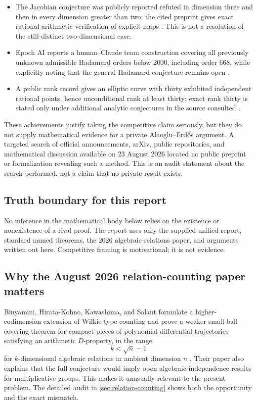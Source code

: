 \documentclass[10pt,oneside]{article}
\theoremstyle{definition}
\theoremstyle{remark}
\begin{document}
\begin{itemize}
\item The Jacobian conjecture was publicly reported refuted in dimension three and then in every dimension greater than two; the cited preprint gives exact rational-arithmetic verification of explicit maps \cite{Gao2026}.  This is not a resolution of the still-distinct two-dimensional case.
\item Epoch AI reports a human--Claude team construction covering all previously unknown admissible Hadamard orders below 2000, including order 668, while explicitly noting that the general Hadamard conjecture remains open \cite{EpochHadamard2026}.
\item A public rank record gives an elliptic curve with thirty exhibited independent rational points, hence unconditional rank at least thirty; exact rank thirty is stated only under additional analytic conjectures in the source consulted \cite{MathWorldRank2026}.
\end{itemize}

These achievements justify taking the competitive claim seriously, but they do not supply mathematical evidence for a private Alaoglu--Erd\H{o}s argument.  A targeted search of official announcements, arXiv, public repositories, and mathematical discussion available on 23 August 2026 located no public preprint or formalization revealing such a method.  This is an audit statement about the search performed, not a claim that no private result exists.

\subsection{Truth boundary for this report}
\begin{cautionbox}
No inference in the mathematical body below relies on the existence or nonexistence of a rival proof.  The report uses only the supplied unified report, standard named theorems, the 2026 algebraic-relations paper, and arguments written out here.  Competitive framing is motivational; it is not evidence.
\end{cautionbox}

\subsection{Why the August 2026 relation-counting paper matters}
Binyamini, Hirata-Kohno, Kawashima, and Salant formulate a higher-codimension extension of Wilkie-type counting and prove a weaker small-ball covering theorem for compact pieces of polynomial differential trajectories satisfying an arithmetic \(D\)-property, in the range
\[
 k<\sqrt n-1
\]
for \(k\)-dimensional algebraic relations in ambient dimension \(n\) \cite{BHKKS2026}.  Their paper also explains that the full conjecture would imply open algebraic-independence results for multiplicative groups.  This makes it unusually relevant to the present problem.  The detailed audit in \cref{sec:relation-counting} shows both the opportunity and the exact mismatch.
\end{document}
